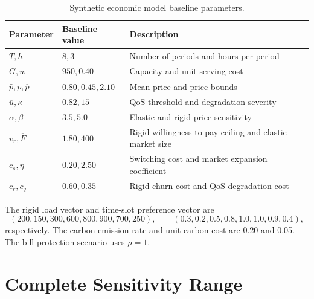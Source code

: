 \documentclass[11pt]{article}
\newcommand{\pcap}{\bar p}
\newcommand{\F}{F}
\begin{document}
\begin{table}[H]
\centering
\caption{Synthetic economic model baseline parameters.}
\label{tab:baseline_parameters}
\begin{tabular}{lll}
\toprule
Parameter & Baseline value & Description \\
\midrule
$T,h$ & $8,3$ & Number of periods and hours per period \\
$G,w$ & $950,0.40$ & Capacity and unit serving cost \\
$\pcap,\underline p,\overline p$ & $0.80,0.45,2.10$ & Mean price and price bounds \\
$\overline u,\kappa$ & $0.82,15$ & QoS threshold and degradation severity \\
$\alpha,\beta$ & $3.5,5.0$ & Elastic and rigid price sensitivity \\
$v_r,\overline{\F}$ & $1.80,400$ & Rigid willingness-to-pay ceiling and elastic market size \\
$c_s,\eta$ & $0.20,2.50$ & Switching cost and market expansion coefficient \\
$c_r,c_q$ & $0.60,0.35$ & Rigid churn cost and QoS degradation cost \\
\bottomrule
\end{tabular}
\end{table}

The rigid load vector and time-slot preference vector are
\[
(200,150,300,600,800,900,700,250),\qquad
(0.3,0.2,0.5,0.8,1.0,1.0,0.9,0.4),
\]
respectively. The carbon emission rate and unit carbon cost are 0.20 and
0.05. The bill-protection scenario uses $\rho=1$.

\section{Complete Sensitivity Range}
\end{document}
